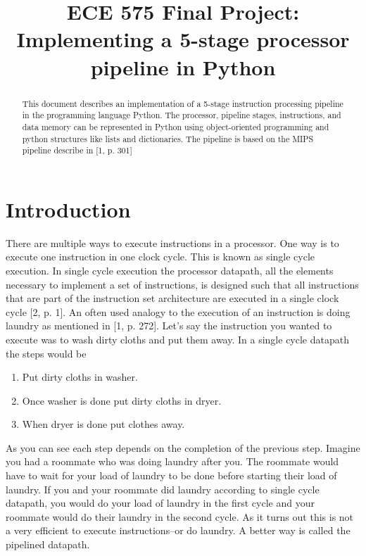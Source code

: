 \documentclass[conference]{IEEEtran}
\begin{document}
\title{ECE 575 Final Project: Implementing a 5-stage processor pipeline in Python}

\author{
}

\maketitle

\begin{abstract}
This document describes an implementation of a 5-stage instruction processing pipeline in the programming language Python.  The processor, pipeline stages, instructions, and data memory can be represented in Python using object-oriented programming and python structures like lists and dictionaries.  The pipeline is based on the MIPS pipeline describe in [1, p. 301]
\end{abstract}

\section{Introduction}
There are multiple ways to execute instructions in a processor.  One way is to execute one instruction in one clock cycle.  This is known as single cycle execution.  In single cycle execution the processor datapath, all the elements necessary to implement a set of instructions, is designed such that all instructions that are part of the instruction set architecture are executed in a single clock cycle [2, p. 1].  An often used analogy to the execution of an instruction is doing laundry as mentioned in [1, p. 272].  Let's say the instruction you wanted to execute was to wash dirty cloths and put them away.  In a single cycle datapath the steps would be
\begin{enumerate}
    \item Put dirty cloths in washer.
    \item Once washer is done put dirty cloths in dryer.
    \item When dryer is done put clothes away.
\end{enumerate}
As you can see each step depends on the completion of the previous step.  Imagine you had a roommate who was doing laundry after you. The roommate would have to wait for your load of laundry to be done before starting their load of laundry.  If you and your roommate did laundry according to single cycle datapath, you would do your load of laundry in the first cycle and your roommate would do their laundry in the second cycle.  As it turns out this is not a very efficient to execute instructions--or do laundry.  A better way is called the pipelined datapath.
\end{document}
